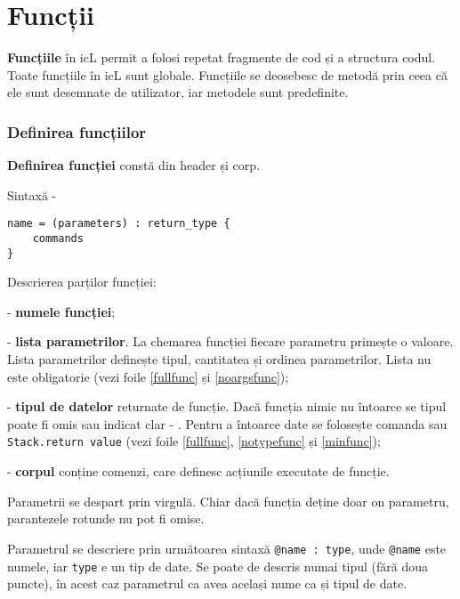 \section{Funcții}

{\bf Funcțiile} în icL permit a folosi repetat fragmente de cod și a structura codul. Toate funcțiile în icL sunt globale. Funcțiile se deosebesc de metodă prin ceea că ele sunt desemnate de utilizator, iar metodele sunt predefinite.

\subsubsection{Definirea funcțiilor}

{\bf Definirea funcției} constă din header și corp.

\noindent Sintaxă -
\begin{lstlisting}[numbers=none]
name = (parameters) : return_type {
	commands
}
\end{lstlisting}

Descrierea parților funcției:
\begin{icItems}
\item
	 - {\bf numele funcției};
\item
	 - {\bf lista parametrilor}. La chemarea funcției fiecare parametru primește o valoare. Lista parametrilor definește tipul, cantitatea și ordinea parametrilor. Lista nu este obligatorie (vezi foile \ref{fullfunc} și \ref{noargsfunc});
\item
	 - {\bf tipul de datelor} returnate de funcție. Dacă funcția nimic nu întoarce se tipul poate fi omis sau indicat clar - \void{}. Pentru a întoarce date se folosește comanda  sau \lstinline|Stack.return value| (vezi foile \ref{fullfunc}, \ref{notypefunc} și \ref{minfunc});
\item
	 - {\bf corpul} conține comenzi, care definesc acțiunile executate de funcție.
\end{icItems}

Parametrii se despart prin virgulă. Chiar dacă funcția deține doar on parametru, parantezele rotunde nu pot fi omise.

Parametrul se descriere prin următoarea sintaxă \lstinline|@name : type|, unde \lstinline|@name| este numele, iar \lstinline|type| e un tip de date. Se poate de descris numai tipul (fără doua puncte), în acest caz parametrul ca avea același nume ca și tipul de date.

